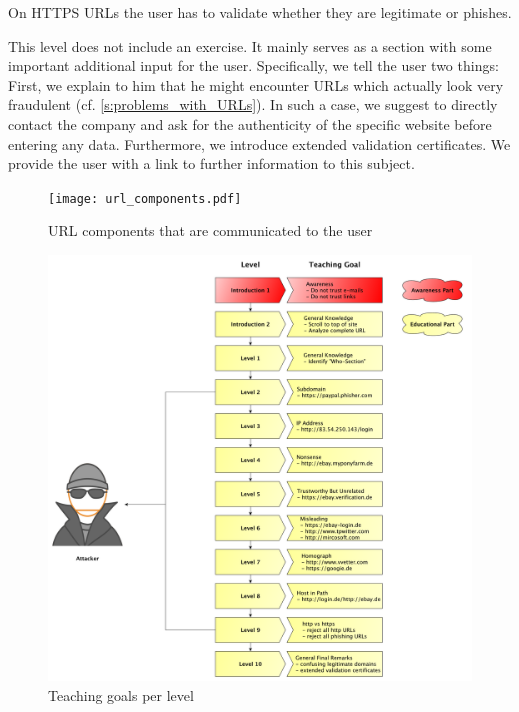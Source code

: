 \begin{description}[leftmargin=0cm]
On HTTPS URLs the user has to validate whether they are legitimate or phishes.
	\item[Level 10] This level does not include an exercise.
 It mainly serves as a section with some important additional input for the user.
 Specifically, we tell the user two things: First, we explain to him that he might encounter URLs which actually look very fraudulent (cf. \autoref{s:problems_with_URLs}).
 In such a case, we suggest to directly contact the company and ask for the authenticity of the specific website before entering any data.
 Furthermore, we introduce extended validation certificates.
 We provide the user with a link to further information to this subject.
\end{description}

\begin{figure}[hHtbp]
\centering
\texttt{[image: url\_components.pdf]}
\caption{URL components that are communicated to the user}
\label{fig:url_components}
\end{figure}

\begin{figure}[hHtbp]
\centering
\includegraphics[width=1.0\textwidth]{graphix/level_teaching_goals.pdf}
\caption{Teaching goals per level}
\label{fig:level_teaching_goals}
\end{figure}


